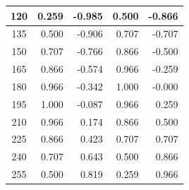 \begin{table}[htbp]
\begin{center}
\begin{tabular}{|p{20mm}|p{20mm}|p{20mm}|p{20mm}|p{20mm}|}
            \multicolumn{1}{|c|}{120}                  & \multicolumn{1}{|r|}{0.259}                      & \multicolumn{1}{|r|}{-0.985}       & \multicolumn{1}{|r|}{0.500}       & \multicolumn{1}{|r|}{-0.866}      \\ \hline
            \multicolumn{1}{|c|}{135}                  & \multicolumn{1}{|r|}{0.500}                      & \multicolumn{1}{|r|}{-0.906}       & \multicolumn{1}{|r|}{0.707}       & \multicolumn{1}{|r|}{-0.707}      \\ \hline
            \multicolumn{1}{|c|}{150}                  & \multicolumn{1}{|r|}{0.707}                      & \multicolumn{1}{|r|}{-0.766}       & \multicolumn{1}{|r|}{0.866}       & \multicolumn{1}{|r|}{-0.500}      \\ \hline
            \multicolumn{1}{|c|}{165}                  & \multicolumn{1}{|r|}{0.866}                      & \multicolumn{1}{|r|}{-0.574}       & \multicolumn{1}{|r|}{0.966}       & \multicolumn{1}{|r|}{-0.259}      \\ \hline
            \multicolumn{1}{|c|}{180}                  & \multicolumn{1}{|r|}{0.966}                      & \multicolumn{1}{|r|}{-0.342}       & \multicolumn{1}{|r|}{1.000}       & \multicolumn{1}{|r|}{-0.000}      \\ \hline
            \multicolumn{1}{|c|}{195}                  & \multicolumn{1}{|r|}{1.000}                      & \multicolumn{1}{|r|}{-0.087}       & \multicolumn{1}{|r|}{0.966}       & \multicolumn{1}{|r|}{0.259}      \\ \hline
            \multicolumn{1}{|c|}{210}                  & \multicolumn{1}{|r|}{0.966}                      & \multicolumn{1}{|r|}{0.174}        & \multicolumn{1}{|r|}{0.866}       & \multicolumn{1}{|r|}{0.500}      \\ \hline
            \multicolumn{1}{|c|}{225}                  & \multicolumn{1}{|r|}{0.866}                      & \multicolumn{1}{|r|}{0.423}        & \multicolumn{1}{|r|}{0.707}       & \multicolumn{1}{|r|}{0.707}      \\ \hline
            \multicolumn{1}{|c|}{240}                  & \multicolumn{1}{|r|}{0.707}                      & \multicolumn{1}{|r|}{0.643}        & \multicolumn{1}{|r|}{0.500}       & \multicolumn{1}{|r|}{0.866}      \\ \hline
            \multicolumn{1}{|c|}{255}                  & \multicolumn{1}{|r|}{0.500}                      & \multicolumn{1}{|r|}{0.819}        & \multicolumn{1}{|r|}{0.259}       & \multicolumn{1}{|r|}{0.966}      \\ \hline

\end{tabular}
\end{center}
\end{table}
